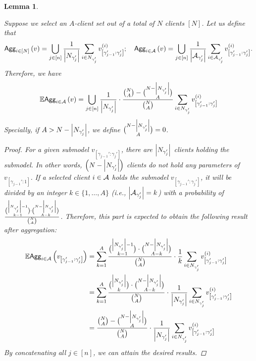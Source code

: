\documentclass{article}
\theoremstyle{plain}
\newtheorem{lemma}[theorem]{Lemma}
\theoremstyle{definition}
\theoremstyle{remark}
\newcommand{\E}{\mathbb{E}}
\newcommand{\bracket}[1]{\left(#1\right)}
\begin{document}
\begin{lemma}
\begin{table}[h]
    \label{tab:client_set}
\end{table}
Suppose we select an $A$-client set out of a total of $N$ clients $[N]$. Let us define that 
\begin{equation}
    \agg{i \in [N]} \bracket{v} = \bigcup_{j \in [n]} \frac{1}{\left|\n{j}\right|} \sum_{i \in \n{j}} \v{j}^{(i)}; \quad \agg{i \in \participant} \bracket{v} = \bigcup_{j \in [n]} \frac{1}{\left|\a{j}\right|} \sum_{i \in \a{j}} \v{j}^{(i)}. 
\end{equation}
Therefore, we have
\begin{equation}
    \E \agg{i \in \participant} \bracket{v} = \bigcup_{j \in [n]} \frac{1}{\left|\n{j}\right|} \cdot \frac{\binom{N}{A} - \binom{N - \left|\n{j}\right|}{A}}{\binom{N}{A}} \sum_{i \in \n{j}} \v{j}^{(i)}
\end{equation}
Specially, if $A > N - \left|N_{\gamma_{j}'}\right|$, we define $\binom{N - \left|N_{\gamma_{j}'}\right|}{A} = 0$. 
\begin{proof}
For a given submodel $v_{\left[\gamma_{j-1}':\gamma_{j}'\right]}$, there are $\left|N_{\gamma_{j}'}\right|$ clients holding the submodel. In other words, $\left(N - \left|N_{\gamma_{j}'}\right|\right)$ clients do not hold any parameters of $v_{\left[\gamma_{j-1}':1\right]}$. If a selected client $i \in \mathcal{A}$ holds the submodel $v_{\left[\gamma_{j-1}':\gamma_{j}'\right]}$, it will be divided by an integer $k \in \{1, \dots, A\}$ (i.e., $\left|\mathcal{A}_{\gamma_{j}'}\right| = k$) with a probability of $\frac{\binom{\left|N_{\gamma_{j}'}\right|-1}{k-1} \cdot \binom{N - \left|N_{\gamma_{j}'}\right|}{A - k}}{\binom{N}{A}}$. Therefore, this part is expected to obtain the following result after aggregation:
\begin{align}
    \E \agg{i \in \participant} \bracket{v_{\left[\gamma_{j-1}':\gamma_{j}'\right]}} &= \sum_{k=1}^{A} \frac{\binom{\left|\n{j}\right|-1}{k-1} \cdot \binom{N - \left|\n{j}\right|}{A - k}}{\binom{N}{A}} \cdot \frac{1}{k} \sum_{i \in \n{j}} \v{j}^{(i)} \\
    & = \sum_{k=1}^{A} \frac{\binom{\left|\n{j}\right|}{k} \cdot \binom{N - \left|\n{j}\right|}{A - k}}{\binom{N}{A}} \cdot \frac{1}{\left|\n{j}\right|} \sum_{i \in \n{j}} \v{j}^{(i)}\\
    & = \frac{\binom{N}{A} - \binom{N - \left|\n{j}\right|}{A}}{\binom{N}{A}} \cdot \frac{1}{\left|\n{j}\right|} \sum_{i \in \n{j}} \v{j}^{(i)}
\end{align}
By concatenating all $j \in [n]$, we can attain the desired results.
\end{proof}
\end{lemma}
\end{document}
